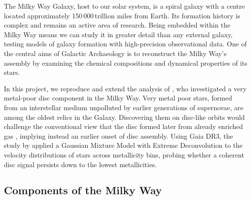 \documentclass[a4paper,12pt]{article}
\begin{document}
The Milky Way Galaxy, host to our solar system, is a spiral galaxy with a centre 
located approximately 150\,000\,trillion miles from Earth. 
Its formation history is complex and remains an active area of research. Being embedded 
within the Milky Way means we can study it in greater detail than any external galaxy, 
testing models of galaxy formation with high-precision observational data. One of the 
central aims of Galactic Archaeology is to reconstruct the Milky Way’s assembly by 
examining the chemical compositions and dynamical properties of its stars.

In this project, we reproduce and extend the analysis of \citet{zhang2024existencemetalpoordiscmilky}, 
who investigated a very metal-poor disc component in the Milky Way. Very metal poor 
stars, formed from an interstellar medium unpolluted by earlier generations of 
supernovae, are among the oldest relics in the Galaxy. Discovering them on disc-like 
orbits would challenge the conventional view that the disc formed later from already 
enriched gas \citep{BlandHawthorn2016}, implying instead an earlier onset of disc 
assembly. Using Gaia DR3, the study by \citet{zhang2024existencemetalpoordiscmilky} 
applied a Gaussian Mixture Model with Extreme Deconvolution to the velocity 
distributions of stars across metallicity bins, probing whether a coherent disc signal 
persists down to the lowest metallicities.

\subsection{Components of the Milky Way}
\end{document}
